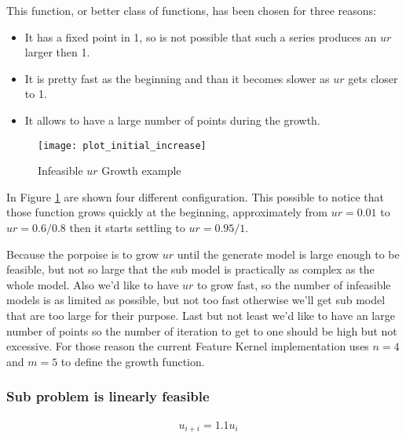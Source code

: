     This function, or better class of functions, has been chosen for three reasons:
    \begin{itemize}
        \item It has a fixed point in 1, so is not possible that such a series produces an $ur$ larger then 1.
        \item It is pretty fast as the beginning and than it becomes slower as $ur$ gets closer to 1.
        \item It allows to have a large number of points during the growth.
    \end{itemize}


    \begin{figure}[H]
        \centering
        \texttt{[image: plot\_initial\_increase]}
        \caption{Infeasible $ur$ Growth example}\label{fig:inf-grow-plot}
    \end{figure}
    
    In Figure \ref{fig:inf-grow-plot} are shown four different configuration. This possible to notice that those function
    grows quickly at the beginning, approximately from $ur = 0.01$ to $ur = 0.6 / 0.8$ then it starts settling
    to $ur = 0.95 / 1$.

    
    Because the porpoise is to grow $ur$ until the generate model is large enough to be feasible, but not so large 
    that the sub model is practically as complex as the whole model. Also we'd like to have $ur$ to grow fast, so the number
    of infeasible models is as limited as possible, but not too fast otherwise we'll get sub model that are too large for their
    purpose. Last but not least we'd like to have an large number of points so the number of iteration to get to one should be high 
    but not excessive.
    For those reason the current Feature Kernel implementation uses $n = 4$ and $m = 5$ to define the growth function.

    


\subsubsection*{Sub problem is linearly feasible}
    \begin{align}
        &u_{i+i} = 1.1 u_{i} \label{eq:ur-lin-fease-grow}
    \end{align}

